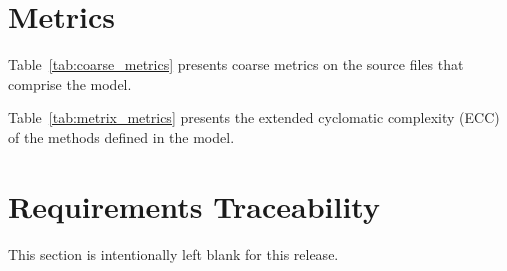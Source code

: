 \section{Metrics}

Table~\ref{tab:coarse_metrics} presents coarse metrics on the source
files that comprise the model.


Table~\ref{tab:metrix_metrics} presents the extended cyclomatic complexity (ECC)
of the methods defined in the model.



\newpage
\section{Requirements Traceability}
This section is intentionally left blank for this release.
%
